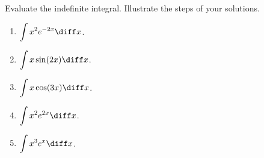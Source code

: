 Evaluate the indefinite integral. Illustrate the steps of your solutions.
\begin{multicols}{2}
\begin{enumerate}[ref={\fcProblemRef}]
\item \label{problemintx^2e^(-2x)dx} $\displaystyle \int x^2 e^{-2x}\diff x$.
\item $\displaystyle \int x \sin (2x)\diff x$.
\item $\displaystyle \int x \cos (3x)\diff x$.
\item $\displaystyle \int x^2 e^{2x}\diff x$.
\item $\displaystyle \int x^3 e^x \diff x$.
\end{enumerate}
\end{multicols}